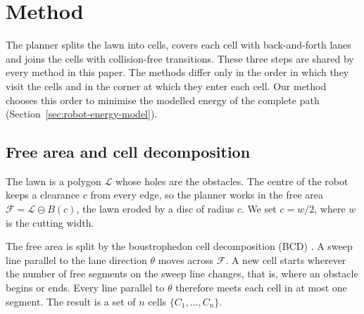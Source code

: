 
\section{Method}
\label{sec:method}


The planner splits the lawn into cells, covers each cell with back-and-forth lanes and joins the cells with collision-free transitions.
These three steps are shared by every method in this paper.
The methods differ only in the order in which they visit the cells and in the corner at which they enter each cell.
Our method chooses this order to minimise the modelled energy of the complete path (Section~\ref{sec:robot-energy-model}).

\subsection{Free area and cell decomposition}
\label{sec:method-decomposition}

The lawn is a polygon $\mathcal{L}$ whose holes are the obstacles.
The centre of the robot keeps a clearance $c$ from every edge, so the planner works in the free area $\mathcal{F} = \mathcal{L} \ominus B(c)$, the lawn eroded by a disc of radius $c$.
We set $c = w/2$, where $w$ is the cutting width.

The free area is split by the boustrophedon cell decomposition (BCD) \cite{chosetCoveragePathPlanning2000}.
A sweep line parallel to the lane direction $\theta$ moves across $\mathcal{F}$.
A new cell starts wherever the number of free segments on the sweep line changes, that is, where an obstacle begins or ends.
Every line parallel to $\theta$ therefore meets each cell in at most one segment.
The result is a set of $n$ cells $\{C_1, \dots, C_n\}$.

